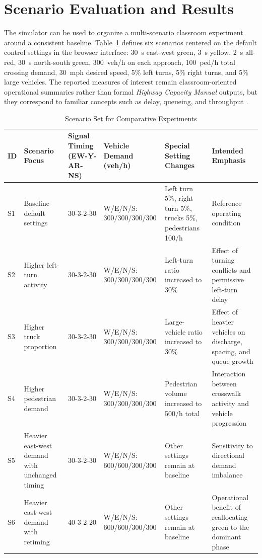 \documentclass[conference]{IEEEtran}
\begin{document}
\section{Scenario Evaluation and Results}
The simulator can be used to organize a multi-scenario classroom experiment around a consistent baseline. Table~\ref{tab:scenarios} defines six scenarios centered on the default control settings in the browser interface: 30~s east-west green, 3~s yellow, 2~s all-red, 30~s north-south green, 300~veh/h on each approach, 100~ped/h total crossing demand, 30~mph desired speed, 5\% left turns, 5\% right turns, and 5\% large vehicles. The reported measures of interest remain classroom-oriented operational summaries rather than formal \emph{Highway Capacity Manual} outputs, but they correspond to familiar concepts such as delay, queueing, and throughput \cite{hcm2016}.

\begin{table}[!t]
\caption{Scenario Set for Comparative Experiments}
\label{tab:scenarios}
\centering
\footnotesize
\setlength{\tabcolsep}{4pt}
\begin{tabular}{p{0.85cm} p{3.7cm} p{2.0cm} p{2.9cm} p{2.9cm} p{1.45cm}}
\toprule
ID & Scenario Focus & Signal Timing (EW-Y-AR-NS) & Vehicle Demand (veh/h) & Special Setting Changes & Intended Emphasis \\
\midrule
S1 & Baseline default settings & 30-3-2-30 & W/E/N/S: 300/300/300/300 & Left turn 5\%, right turn 5\%, trucks 5\%, pedestrians 100/h & Reference operating condition \\

S2 & Higher left-turn activity & 30-3-2-30 & W/E/N/S: 300/300/300/300 & Left-turn ratio increased to 30\% & Effect of turning conflicts and permissive left-turn delay \\

S3 & Higher truck proportion & 30-3-2-30 & W/E/N/S: 300/300/300/300 & Large-vehicle ratio increased to 30\% & Effect of heavier vehicles on discharge, spacing, and queue growth \\

S4 & Higher pedestrian demand & 30-3-2-30 & W/E/N/S: 300/300/300/300 & Pedestrian volume increased to 500/h total & Interaction between crosswalk activity and vehicle progression \\

S5 & Heavier east-west demand with unchanged timing & 30-3-2-30 & W/E/N/S: 600/600/300/300 & Other settings remain at baseline & Sensitivity to directional demand imbalance \\

S6 & Heavier east-west demand with retiming & 40-3-2-20 & W/E/N/S: 600/600/300/300 & Other settings remain at baseline & Operational benefit of reallocating green to the dominant phase \\
\bottomrule
\end{tabular}
\end{table}
\end{document}
